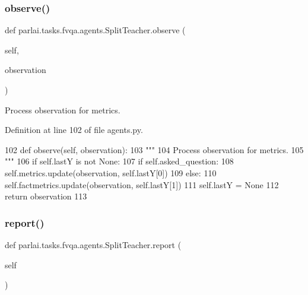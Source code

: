 \subsubsection{\texorpdfstring{observe()}{observe()}}
{\footnotesize\ttfamily def parlai.\+tasks.\+fvqa.\+agents.\+Split\+Teacher.\+observe (\begin{DoxyParamCaption}\item[{}]{self,  }\item[{}]{observation }\end{DoxyParamCaption})}

\begin{DoxyVerb}Process observation for metrics.
\end{DoxyVerb}
 

Definition at line 102 of file agents.\+py.


\begin{DoxyCode}
102     \textcolor{keyword}{def }observe(self, observation):
103         \textcolor{stringliteral}{"""}
104 \textcolor{stringliteral}{        Process observation for metrics.}
105 \textcolor{stringliteral}{        """}
106         \textcolor{keywordflow}{if} self.lastY \textcolor{keywordflow}{is} \textcolor{keywordflow}{not} \textcolor{keywordtype}{None}:
107             \textcolor{keywordflow}{if} self.asked\_question:
108                 self.metrics.update(observation, self.lastY[0])
109             \textcolor{keywordflow}{else}:
110                 self.factmetrics.update(observation, self.lastY[1])
111                 self.lastY = \textcolor{keywordtype}{None}
112         \textcolor{keywordflow}{return} observation
113 
\end{DoxyCode}
\mbox{\label{classparlai_1_1tasks_1_1fvqa_1_1agents_1_1SplitTeacher_a1dd97916b9ebfa15118857af24da682a}} 
\subsubsection{\texorpdfstring{report()}{report()}}
{\footnotesize\ttfamily def parlai.\+tasks.\+fvqa.\+agents.\+Split\+Teacher.\+report (\begin{DoxyParamCaption}\item[{}]{self }\end{DoxyParamCaption})}



